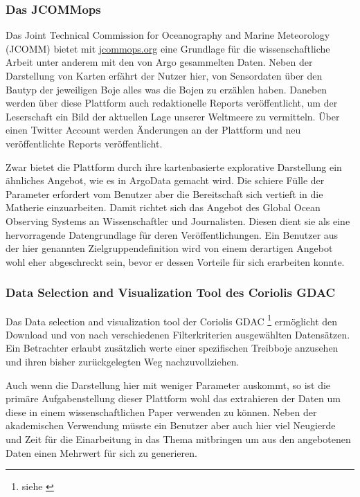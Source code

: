 \subsubsection{Das JCOMMops} 
   
   Das Joint Technical Commission for Oceanography and Marine Meteorology (JCOMM) bietet mit 
    \url{jcommops.org} eine Grundlage für die wissenschaftliche Arbeit unter anderem mit den von Argo gesammelten Daten. Neben der Darstellung von Karten erfährt der Nutzer hier, von Sensordaten über den Bautyp der jeweiligen Boje alles was die Bojen zu erzählen haben. Daneben werden über diese Plattform auch redaktionelle Reports veröffentlicht, um der Leserschaft ein Bild der aktuellen Lage unserer Weltmeere zu vermitteln. Über einen Twitter Account werden Änderungen an der Plattform und neu veröffentlichte Reports veröffentlicht. 
    
    Zwar bietet die Plattform durch ihre kartenbasierte explorative Darstellung ein ähnliches Angebot, wie es in ArgoData gemacht wird. Die schiere Fülle der Parameter erfordert vom Benutzer aber die Bereitschaft sich vertieft in die Matherie einzuarbeiten. Damit richtet sich das Angebot des Global Ocean Observing Systems an Wissenschaftler und Journalisten. Diesen dient sie als eine hervorragende Datengrundlage für deren Veröffentlichungen. Ein Benutzer aus der hier genannten Zielgruppendefinition wird von einem derartigen Angebot wohl eher abgeschreckt sein, bevor er dessen Vorteile für sich erarbeiten konnte. 
    
\subsubsection{Data Selection and Visualization Tool des Coriolis GDAC}
    
    Das Data selection and visualization tool der Coriolis GDAC \footnote { siehe \cite{ArgoDataSelection}} ermöglicht den Download und von nach verschiedenen Filterkriterien ausgewählten Datensätzen. Ein Betrachter erlaubt zusätzlich werte einer spezifischen Treibboje anzusehen und ihren bisher zurückgelegten Weg nachzuvollziehen.
    
    Auch wenn die Darstellung hier mit weniger Parameter auskommt, so ist die primäre Aufgabenstellung dieser Plattform wohl das extrahieren der Daten um diese in einem wissenschaftlichen Paper verwenden zu können. Neben der akademischen Verwendung müsste ein Benutzer aber auch hier viel Neugierde und Zeit für die Einarbeitung in das Thema mitbringen um aus den angebotenen Daten einen Mehrwert für sich zu generieren. 
    
